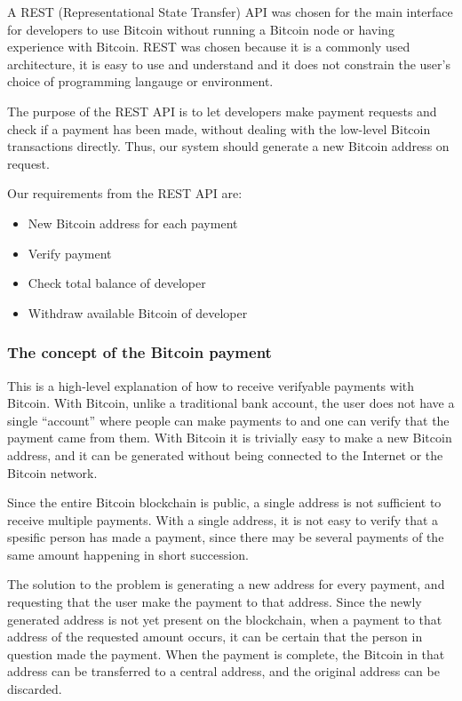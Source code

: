 A REST (Representational State Transfer) API \cite{Oracle.com} was chosen for the main interface for developers to use Bitcoin without running a Bitcoin node or having experience with Bitcoin. REST was chosen because it is a commonly used architecture, it is easy to use and understand and it does not constrain the user's choice of programming langauge or environment. 

The purpose of the REST API is to let developers make payment requests and check if a payment has been made, without dealing with the low-level Bitcoin transactions directly. Thus, our system should generate a new Bitcoin address on request. 

Our requirements from the REST API are:

\begin{itemize}
	\item New Bitcoin address for each payment
	\item Verify payment
	\item Check total balance of developer
	\item Withdraw available Bitcoin of developer
\end{itemize}

\subsubsection{The concept of the Bitcoin payment}

This is a high-level explanation of how to receive verifyable payments with Bitcoin. With Bitcoin, unlike a traditional bank account, the user does not have a single ``account'' where people can make payments to and one can verify that the payment came from them. With Bitcoin it is trivially easy to make a new Bitcoin address, and it can be generated without being connected to the Internet or the Bitcoin network.

Since the entire Bitcoin blockchain is public, a single address is not sufficient to receive multiple payments. With a single address, it is not easy to verify that a spesific person has made a payment, since there may be several payments of the same amount happening in short succession.

The solution to the problem is generating a new address for every payment, and requesting that the user make the payment to that address. Since the newly generated address is not yet present on the blockchain, when a payment to that address of the requested amount occurs, it can be certain that the person in question made the payment. When the payment is complete, the Bitcoin in that address can be transferred to a central address, and the original address can be discarded.


